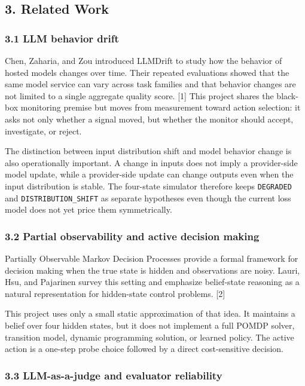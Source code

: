 \documentclass[
]{article}
\begin{document}
\subsection{3. Related Work}\label{related-work}

\subsubsection{3.1 LLM behavior drift}\label{llm-behavior-drift}

Chen, Zaharia, and Zou introduced LLMDrift to study how the behavior of
hosted models changes over time. Their repeated evaluations showed that
the same model service can vary across task families and that behavior
changes are not limited to a single aggregate quality score. {[}1{]}
This project shares the black-box monitoring premise but moves from
measurement toward action selection: it asks not only whether a signal
moved, but whether the monitor should accept, investigate, or reject.

The distinction between input distribution shift and model behavior
change is also operationally important. A change in inputs does not
imply a provider-side model update, while a provider-side update can
change outputs even when the input distribution is stable. The
four-state simulator therefore keeps \texttt{DEGRADED} and
\texttt{DISTRIBUTION\_SHIFT} as separate hypotheses even though the
current loss model does not yet price them symmetrically.

\subsubsection{3.2 Partial observability and active decision
making}\label{partial-observability-and-active-decision-making}

Partially Observable Markov Decision Processes provide a formal
framework for decision making when the true state is hidden and
observations are noisy. Lauri, Hsu, and Pajarinen survey this setting
and emphasize belief-state reasoning as a natural representation for
hidden-state control problems. {[}2{]}

This project uses only a small static approximation of that idea. It
maintains a belief over four hidden states, but it does not implement a
full POMDP solver, transition model, dynamic programming solution, or
learned policy. The active action is a one-step probe choice followed by
a direct cost-sensitive decision.

\subsubsection{3.3 LLM-as-a-judge and evaluator
reliability}\label{llm-as-a-judge-and-evaluator-reliability}
\end{document}
